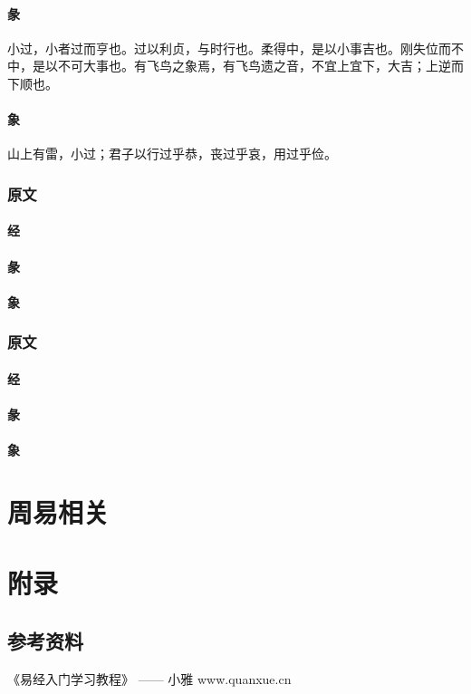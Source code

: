 \documentclass[12pt,oneside]{book}
\begin{document}
\subsection{彖}
小过，小者过而亨也。过以利贞，与时行也。柔得中，是以小事吉也。刚失位而不中，是以不可大事也。有飞鸟之象焉，有飞鸟遗之音，不宜上宜下，大吉；上逆而下顺也。

\subsection{象}
山上有雷，小过；君子以行过乎恭，丧过乎哀，用过乎俭。



\section{原文}
\subsection{经}
\subsection{彖}
\subsection{象}

\section{原文}
\subsection{经}
\subsection{彖}
\subsection{象}





\part{周易相关}




\part{附录}
\chapter{参考资料}

《易经入门学习教程》 —— 小雅 www.quanxue.cn







\end{document}
